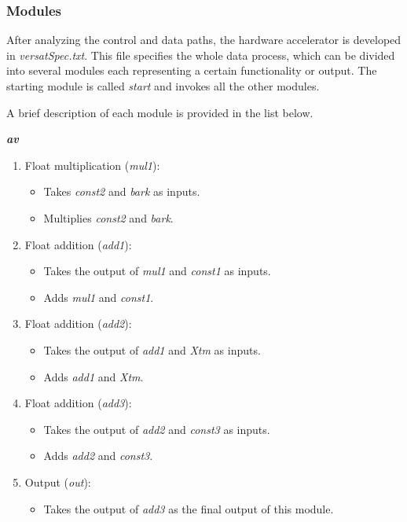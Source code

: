 \vspace{0.5cm}

\subsubsection{Modules}
After analyzing the control and data paths, the hardware accelerator is developed in \textit{versatSpec.txt}. This file specifies the whole data process, which can be divided into several modules each representing a certain functionality or output. The starting module is called \textit{start} and invokes all the other modules.

A brief description of each module is provided in the list below.

\vspace{0.5cm}

\textit{\textbf{av}}

\begin{enumerate}

\item Float multiplication (\textit{mul1}):
\begin{itemize}
\item Takes \textit{const2} and \textit{bark} as inputs.
\item Multiplies \textit{const2} and \textit{bark}.
\end{itemize}

\item Float addition (\textit{add1}):
\begin{itemize}
\item Takes the output of \textit{mul1} and \textit{const1} as inputs.
\item Adds \textit{mul1} and \textit{const1}.
\end{itemize}

\item Float addition (\textit{add2}):
\begin{itemize}
\item Takes the output of \textit{add1} and \textit{Xtm} as inputs.
\item Adds \textit{add1} and \textit{Xtm}.
\end{itemize}

\item Float addition (\textit{add3}):
\begin{itemize}
\item Takes the output of \textit{add2} and \textit{const3} as inputs.
\item Adds \textit{add2} and \textit{const3}.
\end{itemize}

\item Output (\textit{out}):
\begin{itemize}
\item Takes the output of \textit{add3} as the final output of this module.
\end{itemize}

\end{enumerate}


